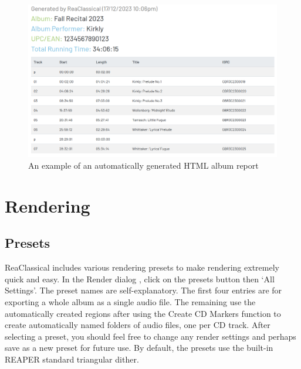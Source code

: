 \documentclass[10pt,american]{article}
\begin{document}
\begin{figure}
\includegraphics[width=1\linewidth]{user_guide_images/html_album_report}

\caption{An example of an automatically generated HTML album report}

\end{figure}


\section{Rendering}

\subsection{Presets}

ReaClassical includes various rendering presets to make rendering extremely
quick and easy. In the Render dialog , click on the presets button then
`All Settings'. The preset names are self-explanatory. The first four entries
are for exporting a whole album as a single audio file. The remaining use the
automatically created regions after using the Create CD Markers function
 to create automatically named folders of audio files, one per CD track.
After selecting a preset, you should feel free to change any render settings and
perhaps save as a new preset for future use. By default, the presets use the
built-in REAPER standard triangular dither.
\end{document}
